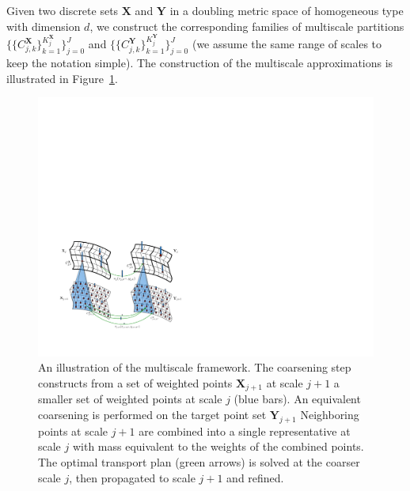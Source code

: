 \documentclass[twoside,11pt]{article}
\newcommand{\Xsp}{{\mathbf{X}}}
\newcommand{\Ysp}{{\mathbf{Y}}}
\begin{document}
Given two discrete sets ${\Xsp}$ and ${\Ysp}$ in a doubling metric space of
homogeneous type with dimension $d$, we construct the corresponding families of
multiscale partitions $\{\{C^{{\Xsp}}_{j,k}\}_{k=1}^{K^{{\Xsp}}_j}\}_{j=0}^J$
and $\{\{C^{{\Ysp}}_{j,k}\}_{k=1}^{K^{{\Ysp}}_j}\}_{j=0}^J$ (we assume the same
range of scales to keep the notation simple). The construction of the
multiscale approximations is illustrated in Figure~\ref{fig:multiscalepic}.
\begin{figure}[thb]
\centering
\includegraphics[width=0.99\linewidth]{figures/MultiscalePic.pdf}
\caption{
\label{fig:multiscalepic}
An illustration of the multiscale framework. The coarsening step constructs
from a set of weighted points $\Xsp_{j+1}$ at scale $j+1$ a smaller set of
weighted points at scale $j$ (blue bars). An equivalent
coarsening is performed on the target point set $\Ysp_{j+1}$ Neighboring points
at scale $j+1$ are combined into a single representative at scale $j$ with mass
equivalent to the weights of the combined points. The optimal transport plan
(green arrows) is solved at the coarser scale $j$, then propagated to scale
$j+1$ and refined.  
} 
\end{figure}
\end{document}
